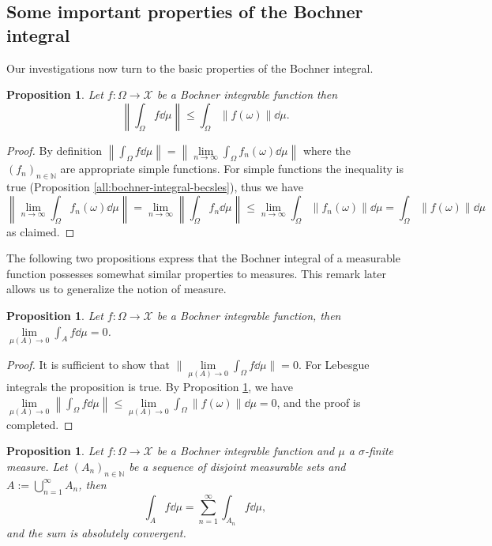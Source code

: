 \documentclass[a4paper, 12pt]{article}
\newtheorem{state}[lem]{Proposition}
\begin{document}
\subsection{Some important properties of the Bochner integral}\label{all:bochner-prop} Our investigations now turn to the basic properties of the Bochner integral.
\begin{state}\label{all:bochner-integral-becsles2} Let $f \colon \Omega \rightarrow \mathcal{X}$ be a Bochner integrable function then 
$$\left \| \int_{\Omega} f \dd{\mu} \right \| \leqslant \int_{\Omega} \| f(\omega) \| \dd{\mu} .$$
\end{state}
\begin{proof}
By definition $\left\| \int_{\Omega} f \dd{\mu} \right\| = \left\| \lim\limits_{n \to \infty} \int_{\Omega} f_n(\omega) \dd{\mu} \right\|$ where the $(f_n)_{n \in \mathbb{N}}$ are appropriate simple functions.  For simple functions the inequality is true (Proposition \ref{all:bochner-integral-becsles}), thus we have 
$$
 \left\| \lim\limits_{n \to \infty} \int_{\Omega} f_n(\omega) \dd{\mu} \right\|=\lim\limits_{n \to \infty} \left\| \int_{\Omega} f_n  \dd{\mu}  \right\| \leqslant \lim\limits_{n \to \infty} \int_{\Omega} \| f_n(\omega) \| \dd{\mu} = \int_{\Omega} \| f(\omega) \| \dd{\mu}
$$
as claimed.
\end{proof}
The following two propositions express that the Bochner integral of a measurable function possesses somewhat similar properties to measures. This remark later allows us to generalize the notion of measure.
\begin{state}\label{all:nullmerteku-integralas} Let $f \colon \Omega \rightarrow \mathcal{X}$ be a Bochner integrable function, then $\lim\limits_{\mu(A) \to 0} \int_{A} f \dd{\mu} = 0$.
\end{state}
\begin{proof} It is sufficient to show that $\| \lim\limits_{\mu(A) \to 0}\int_{\Omega}f \dd{\mu} \| = 0$. For Lebesgue integrals the proposition is true. By Proposition \ref{all:bochner-integral-becsles2}, we have $\lim\limits_{\mu(A) \to 0}\left \| \int_{\Omega} f \dd{\mu} \right \| \leqslant \lim\limits_{\mu(A) \to 0}\int_{\Omega} \| f(\omega) \| \dd{\mu} = 0$, and the proof is completed.
\end{proof}
\begin{state}\label{all:integrate-on-union} Let $f\colon \Omega \rightarrow \mathcal{X}$ be a Bochner integrable function and $\mu$ a $\sigma$-finite measure. Let $(A_n)_{n \in \mathbb{N}}$ be a sequence of disjoint measurable sets and $A := \bigcup\limits^{\infty}_{n=1} A_n$, then
$$
\int_{A} f \dd{\mu} = \sum^{\infty}_{n=1} \int_{A_n} f \dd{\mu},
$$
and the sum is absolutely convergent.
\end{state}
\end{document}
